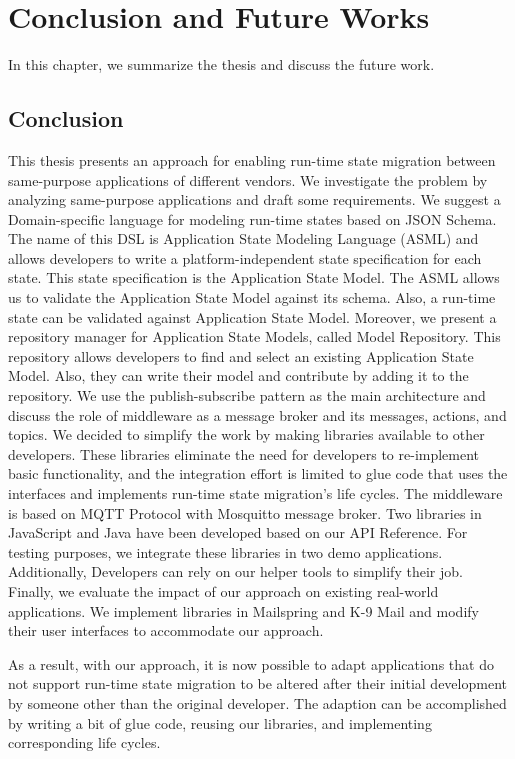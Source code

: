 \chapter{Conclusion and Future Works}
\label{ch:conclusion}
In this chapter, we summarize the thesis and discuss the future work.

\section{Conclusion}
This thesis presents an approach for enabling run-time state migration between same-purpose applications of different vendors. We investigate the problem by analyzing same-purpose applications and draft some requirements. We suggest a Domain-specific language for modeling run-time states based on JSON Schema. The name of this DSL is Application State Modeling Language (ASML) and allows developers to write a platform-independent state specification for each state. This state specification is the Application State Model. The ASML allows us to validate the Application State Model against its schema. Also, a run-time state can be validated against Application State Model.
Moreover, we present a repository manager for Application State Models, called Model Repository. This repository allows developers to find and select an existing Application State Model. Also, they can write their model and contribute by adding it to the repository. We use the publish-subscribe pattern as the main architecture and discuss the role of middleware as a message broker and its messages, actions, and topics. We decided to simplify the work by making libraries available to other developers. These libraries eliminate the need for developers to re-implement basic functionality, and the integration effort is limited to glue code that uses the interfaces and implements run-time state migration's life cycles. The middleware is based on MQTT Protocol with Mosquitto message broker. Two libraries in JavaScript and Java have been developed based on our API Reference. For testing purposes, we integrate these libraries in two demo applications.
Additionally, Developers can rely on our helper tools to simplify their job. Finally, we evaluate the impact of our approach on existing real-world applications. We implement libraries in Mailspring and K-9 Mail and modify their user interfaces to accommodate our approach.

As a result, with our approach, it is now possible to adapt applications that do not support run-time state migration to be altered after their initial development by someone other than the original developer. The adaption can be accomplished by writing a bit of glue code, reusing our libraries, and implementing corresponding life cycles.


